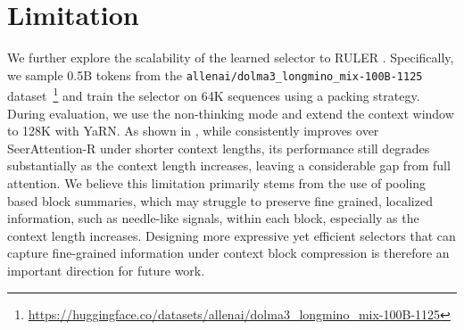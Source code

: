 \section{Limitation}
\label{app:limitation}

We further explore the scalability of the learned selector to RULER \cite{hsieh2024ruler}. Specifically, we sample 0.5B tokens from the \texttt{allenai/dolma3\_longmino\_mix-100B-1125} dataset~\footnote{\url{https://huggingface.co/datasets/allenai/dolma3_longmino_mix-100B-1125}} and train the selector on 64K sequences using a packing strategy. During evaluation, we use the non-thinking mode and extend the context window to 128K with YaRN. As shown in , while \our consistently improves over SeerAttention-R under shorter context lengths, its performance still degrades substantially as the context length increases, leaving a considerable gap from full attention. We believe this limitation primarily stems from the use of pooling based block summaries, which may struggle to preserve fine grained, localized information, such as needle-like signals, within each block, especially as the context length increases. 
Designing more expressive yet efficient selectors that can capture fine-grained information under context block compression is therefore an important direction for future work.

